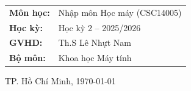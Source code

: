 \begin{titlepage}
  \begin{tabular}{ll}
    \textbf{Môn học:}   & Nhập môn Học máy (CSC14005) \\[0.3em]
    \textbf{Học kỳ:}    & Học kỳ 2 -- 2025/2026 \\[0.3em]
    \textbf{GVHD:}      & Th.S Lê Nhựt Nam \\[0.3em]
    \textbf{Bộ môn:}    & Khoa học Máy tính \\
  \end{tabular}

  \vspace{1.5cm}
  \vfill
  {\small TP. Hồ Chí Minh, \today}
\end{titlepage}

\tableofcontents
\clearpage
\hypersetup{pageanchor=true}
